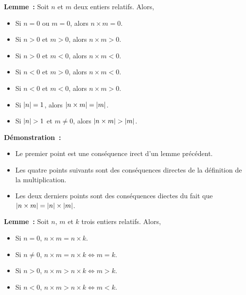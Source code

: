 \done

\medskip

\noindent\textbf{Lemme :} Soit $n$ et $m$ deux entiers relatifs. 
    Alors, 
    \begin{itemize}[nosep]
        \item Si $n = 0$ ou $m = 0$, alors $n \times m = 0$.
        \item Si $n > 0$ et $m > 0$, alors $n \times m > 0$.
        \item Si $n > 0$ et $m < 0$, alors $n \times m < 0$.
        \item Si $n < 0$ et $m > 0$, alors $n \times m < 0$.
        \item Si $n < 0$ et $m < 0$, alors $n \times m > 0$.
        \item Si $\left\lvert n \right\rvert = 1$, alors $\left\lvert n \times m \right\rvert = \left\lvert m \right\rvert$.
        \item Si $\left\lvert n \right\rvert > 1$ et $m \neq 0$, alors $\left\lvert n \times m \right\rvert > \left\lvert m \right\rvert$.
    \end{itemize}

\medskip

\noindent\textbf{Démonstration :}

    \begin{itemize}[nosep]
        \item Le premier point est une conséquence irect d'un lemme précédent.
        \item Les quatre points suivants sont des conséquences directes de la définition de la multiplication.
        \item Les deux derniers points sont des conséquences diectes du fait que $\left\lvert n \times m \right\rvert = \left\lvert n \right\rvert \times \left\lvert m \right\rvert$.
    \end{itemize}
    
    \done

\medskip

\noindent\textbf{Lemme :} Soit $n$, $m$ et $k$ trois entiers relatifs. 
    Alors, 
    \begin{itemize}[nosep]
        \item Si $n = 0$, $n \times m = n \times k$.
        \item Si $n \neq 0$, $n \times m = n \times k \Leftrightarrow m = k$.
        \item Si $n > 0$, $n \times m > n \times k \Leftrightarrow m > k$.
        \item Si $n < 0$, $n \times m > n \times k \Leftrightarrow m < k$.
    \end{itemize}

\medskip

